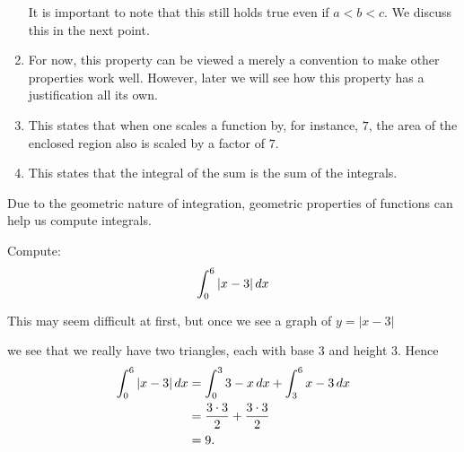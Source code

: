 \documentclass{ximera}
\begin{document}
\begin{theorem}
\begin{explanation}
\begin{enumerate}
\begin{image}
  \end{image}		
  It is important to note that this still holds true even if
  $a<b<c$. We discuss this in the next point.
  
\item For now, this property can be viewed a merely a convention to
  make other properties work well. However, later we will see how this
  property has a justification all its own.

\item This states that when one scales a function by, for instance, $7$,
  the area of the enclosed region also is scaled by a factor of
  $7$.
\item This states that the integral of the sum is the sum of the
  integrals.
\end{enumerate}
\end{explanation}
\end{theorem}

Due to the geometric nature of integration, geometric properties of
functions can help us compute integrals.

\begin{example}
  Compute:
  \[
  \int_0^6 |x-3| \,d x
  \]
  \begin{explanation}
    This may seem difficult at first, but once we see a graph of $y=|x-3|$
    \begin{image}
    \end{image}
    we see that we really have two triangles, each with base $3$ and height $3$.
    Hence
    \begin{align*}
    \int_0^6 |x-3| \,d x &= \int_0^3 3-x \,d x + \int_3^6 x-3 \,d x\\
    &= \frac{3\cdot 3}{2} + \frac{3\cdot 3}{2}\\
    &=9.
    \end{align*}
  \end{explanation}
\end{example}
\end{document}
